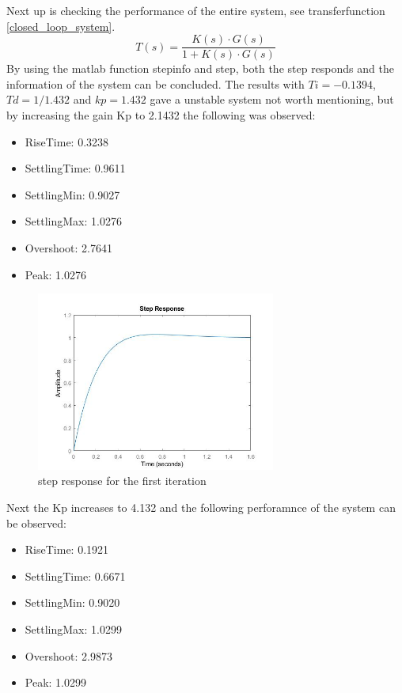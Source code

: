 \documentclass[12pt]{article}
\begin{document}
Next up is checking the performance of the entire system, see transferfunction \ref{closed_loop_system}.
\begin{equation} \label{closed_loop_system}
    T(s) = \frac{K(s) \cdot G(s)}{1+K(s)\cdot G(s)}
\end{equation}
By using the matlab function stepinfo and step, both the step responds and the information of the system can be concluded. The results with $Ti = -0.1394$, $Td = 1/1.432$ and $kp = 1.432$ gave a unstable system not worth mentioning, but by increasing the gain Kp to 2.1432 the following was observed:
\begin{itemize}
  \item RiseTime: 0.3238
  \item SettlingTime: 0.9611
  \item SettlingMin: 0.9027
  \item SettlingMax: 1.0276
  \item Overshoot: 2.7641
  \item Peak: 1.0276
\end{itemize}
\begin{figure}[htbp]
  \centering
  \includegraphics[width=0.7\textwidth]{images/first_kp_adjustment.jpg}
  \caption{step response for the first iteration} \label{my_first_step}
\end{figure}
Next the Kp increases to 4.132 and the following perforamnce of the system can be observed:
\begin{itemize}
  \item RiseTime: 0.1921
  \item SettlingTime: 0.6671
  \item SettlingMin: 0.9020
  \item SettlingMax: 1.0299
  \item Overshoot: 2.9873
  \item Peak: 1.0299
\end{itemize}
\end{document}
